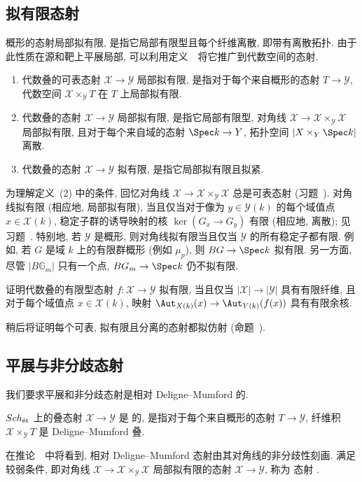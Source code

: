 \subsection{拟有限态射}\label{src:4.3.5-subsection}
概形的态射局部拟有限, 是指它局部有限型且每个纤维离散, 即带有离散拓扑. 由于此性质在源和靶上平展局部, 可以利用定义~~将它推广到代数空间的态射.
\begin{definition}\label{src:4.3.34}
\begin{enumerate}[(1)]
\item 代数叠的可表态射 $\mathcal X\to\mathcal Y$ 局部拟有限, 是指对于每个来自概形的态射 $T\to\mathcal Y$, 代数空间 $\mathcal X\times_{\mathcal Y}T$ 在 $T$ 上局部拟有限.
\item 代数叠的态射 $\mathcal X\to\mathcal Y$ 局部拟有限, 是指它局部有限型, 对角线 $\mathcal X\to\mathcal X\times_{\mathcal Y}\mathcal X$ 局部拟有限, 且对于每个来自域的态射 $\Spec k\to\mathcal Y$, 拓扑空间 $|\mathcal X\times_{\mathcal Y}\Spec k|$ 离散.
\item 代数叠的态射 $\mathcal X\to\mathcal Y$ 拟有限, 是指它局部拟有限且拟紧.
\end{enumerate}
\end{definition}
为理解定义~(2) 中的条件, 回忆对角线 $\mathcal X\to\mathcal X\times_{\mathcal Y}\mathcal X$ 总是可表态射 (习题~). 对角线拟有限 (相应地, 局部拟有限), 当且仅当对于像为 $y\in\mathcal Y(k)$ 的每个域值点 $x\in\mathcal X(k)$, 稳定子群的诱导映射的核 $\ker(G_x\to G_y)$ 有限 (相应地, 离散); 见习题~. 特别地, 若 $\mathcal Y$ 是概形, 则对角线拟有限当且仅当 $\mathcal Y$ 的所有稳定子都有限. 例如, 若 $G$ 是域 $k$ 上的有限群概形 (例如 $\mu_p$), 则 $BG\to\Spec k$ 拟有限. 另一方面, 尽管 $|B\mathbb G_m|$ 只有一个点, $B\mathbb G_m\to\Spec k$ 仍不拟有限.
\begin{exercise}[简单]\label{src:4.3.35}
证明代数叠的有限型态射 $f:\mathcal X\to\mathcal Y$ 拟有限, 当且仅当 $|\mathcal X|\to|\mathcal Y|$ 具有有限纤维, 且对于每个域值点 $x\in\mathcal X(k)$, 映射 $\Aut_{\mathcal X(k)}(x)\to\Aut_{\mathcal Y(k)}(f(x))$ 具有有限余核.
\end{exercise}
稍后将证明每个可表, 拟有限且分离的态射都拟仿射 (命题~).
\subsection{平展与非分歧态射}\label{src:4.3.6-subsection}
我们要求平展和非分歧态射是相对 Deligne--Mumford 的.
\begin{definition}\label{src:4.3.36}
$Sch_{\text{ét}}$ 上的叠态射 $\mathcal X\to\mathcal Y$ 是 的, 是指对于每个来自概形的态射 $T\to\mathcal Y$, 纤维积 $\mathcal X\times_{\mathcal Y}T$ 是 Deligne--Mumford 叠.
\end{definition}
在推论~~中将看到, 相对 Deligne--Mumford 态射由其对角线的非分歧性刻画. 满足较弱条件, 即对角线 $\mathcal X\to\mathcal X\times_{\mathcal Y}\mathcal X$ 局部拟有限的态射 $\mathcal X\to\mathcal Y$, 称为 态射 \cite[Tag 04YW]{SP}.

